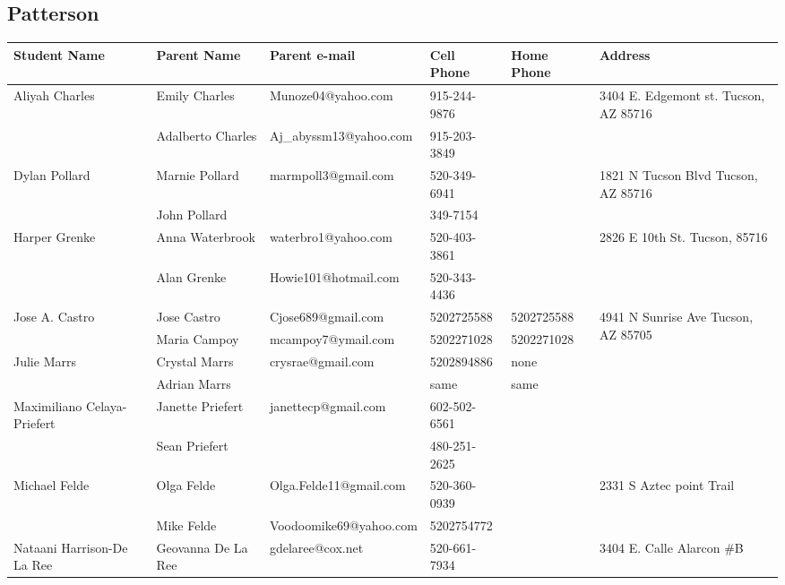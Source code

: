\documentclass[landscape]{article}\usepackage[]{graphicx}\usepackage[]{color}
\begin{document}
\subsection{Patterson}
\begin{longtable}{|p{100pt}|p{100pt}|p{140pt}|p{60pt}|p{64pt}|p{120pt}|}
\textbf{Student Name} & \textbf{Parent Name} & \textbf{Parent e-mail} & \textbf{Cell Phone} & \textbf{Home Phone} & \textbf{Address}\\
\hline
\hline
\multirow{2}{100pt}{Aliyah Charles} & Emily Charles  & Munoze04@yahoo.com & 915-244-9876 &  & \multirow{2}{120pt}{3404 E. Edgemont st. Tucson, AZ 85716} \\
 & Adalberto Charles & Aj\_abyssm13@yahoo.com & 915-203-3849 &  & \\
\hline
\multirow{2}{100pt}{Dylan Pollard} & Marnie Pollard & marmpoll3@gmail.com & 520-349-6941 &  & \multirow{2}{120pt}{1821 N Tucson Blvd Tucson, AZ 85716} \\
 & John Pollard &  & 349-7154 &  & \\
\hline
\multirow{2}{100pt}{Harper Grenke} & Anna Waterbrook & waterbro1@yahoo.com & 520-403-3861 &  & \multirow{2}{120pt}{2826 E 10th St. Tucson, 85716} \\
 & Alan Grenke & Howie101@hotmail.com & 520-343-4436 &  & \\
\hline
\multirow{2}{100pt}{Jose A. Castro} & Jose Castro & Cjose689@gmail.com & 5202725588 & 5202725588 & \multirow{2}{120pt}{4941 N Sunrise Ave Tucson, AZ 85705} \\
 & Maria Campoy & mcampoy7@ymail.com & 5202271028 & 5202271028 & \\
\hline
\multirow{2}{100pt}{Julie Marrs} & Crystal Marrs & crysrae@gmail.com & 5202894886 & none & \multirow{2}{120pt}{} \\
 & Adrian Marrs &  & same & same & \\
\hline
\multirow{2}{100pt}{Maximiliano Celaya-Priefert} & Janette Priefert & janettecp@gmail.com & 602-502-6561 &  & \multirow{2}{120pt}{} \\
 & Sean Priefert &  & 480-251-2625 &  & \\
\hline
\multirow{2}{100pt}{Michael Felde} & Olga Felde & Olga.Felde11@gmail.com & 520-360-0939 &  & \multirow{2}{120pt}{2331 S Aztec point Trail} \\
 & Mike Felde & Voodoomike69@yahoo.com & 5202754772 &  & \\
\hline
\multirow{2}{100pt}{Nataani Harrison-De La Ree} & Geovanna De La Ree & gdelaree@cox.net & 520-661-7934 &  & \multirow{2}{120pt}{3404 E. Calle Alarcon \#B} \\

\end{longtable}
\end{document}
